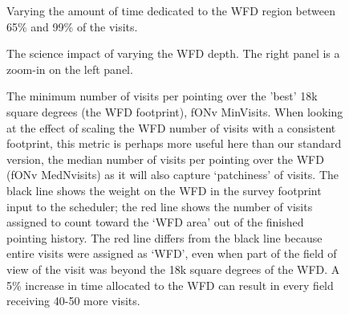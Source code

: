 \begin{figure}
\caption{Varying the amount of time dedicated to the WFD region between 65\% and 99\% of the visits.}
\label{fig:wfd_scale_nvisits}
\end{figure}


\begin{figure}
\caption{The science impact of varying the WFD depth. The right panel is a zoom-in on the left panel.}\label{fig:wfd_depth_radar}
\end{figure}

\begin{figure}
\caption{The minimum number of visits per pointing over the 'best' 18k square degrees (the WFD footprint), fONv MinVisits. When looking at the effect of scaling the WFD number of visits with a consistent footprint, this metric is perhaps more useful here than our standard version, the median number of visits per pointing over the WFD (fONv MedNvisits) as it will also capture `patchiness' of visits. The black line shows the weight on the WFD in the survey footprint input to the scheduler; the red line shows the number of visits assigned to count toward the `WFD area' out of the finished pointing history. The red line differs from the black line because entire visits were assigned as `WFD', even when part of the field of view of the visit was beyond the 18k square degrees of the WFD. A 5\% increase in time allocated to the WFD can result in every field receiving 40-50 more visits.}
\label{fig:wfddepth_fo}
\end{figure}


